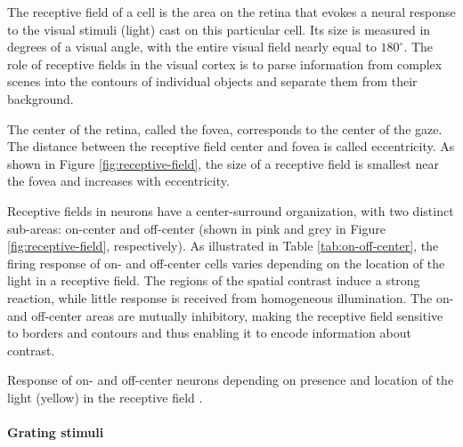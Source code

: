 The receptive field of a cell is the area on the retina that evokes a neural response to the visual stimuli (light) cast on this particular cell. Its size is measured in degrees of a visual angle, with the entire visual field nearly equal to $180^\circ$. The role of receptive fields in the visual cortex is to parse information from complex scenes into the contours of individual objects and separate them from their background.

The center of the retina, called the fovea, corresponds to the center of the gaze. The distance between the receptive field center and fovea is called eccentricity. As shown in Figure \ref{fig:receptive-field}, the size of a receptive field is smallest near the fovea and increases with eccentricity.

Receptive fields in neurons have a center-surround organization, with two distinct sub-areas: on-center and off-center (shown in pink and grey in Figure \ref{fig:receptive-field}, respectively). As illustrated in Table \ref{tab:on-off-center}, the firing response of on- and off-center cells varies depending on the location of the light in a receptive field. The regions of the spatial contrast induce a strong reaction, while little response is received from homogeneous illumination. The on- and off-center areas are mutually inhibitory, making the receptive field sensitive to borders and contours and thus enabling it to encode information about contrast.

\begin{table}[!htp]
    \centering
    
    \caption[Neural response depending on light location]{Response of on- and off-center neurons depending on presence and location of the light (yellow) in the receptive field \cite{KandelBook2003:25}.}
    \label{tab:on-off-center}
\end{table}

\paragraph{Grating stimuli}

